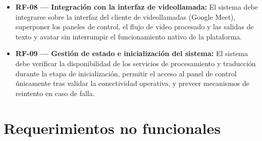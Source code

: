 \begin{itemize}
    \item \textbf{RF-08 --- Integración con la interfaz de videollamada:} El sistema debe integrarse sobre la interfaz del cliente de videollamadas (Google Meet), superponer los paneles de control, el flujo de video procesado y las salidas de texto y avatar sin interrumpir el funcionamiento nativo de la plataforma.
    \item \textbf{RF-09 --- Gestión de estado e inicialización del sistema:} El sistema debe verificar la disponibilidad de los servicios de procesamiento y traducción durante la etapa de inicialización, permitir el acceso al panel de control únicamente tras validar la conectividad operativa, y preveer mecanismos de reintento en caso de falla.
\end{itemize}

\section{Requerimientos no funcionales}
